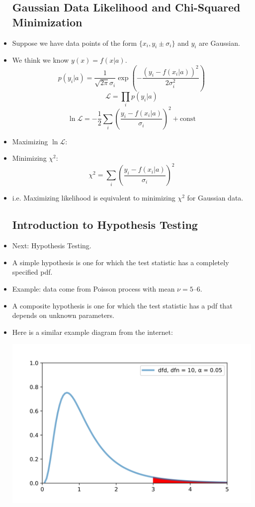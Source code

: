 \begin{itemize}
            \subsection{Gaussian Data Likelihood and Chi-Squared Minimization}
      \item Suppose we have data points of the form $\{ x_i, y_i \pm \sigma_i \}$ and $y_i$ are Gaussian.
      \item We think we know  $y(x) = f(x|a)$.
            \[
                  p(y_i|a) = \frac{1}{\sqrt{2 \pi} \sigma_i} \exp \left( -\frac{(y_i - f(x_i|a))^2}{2 \sigma_i^2} \right)
            \]
            \[
                  \mathcal{L} = \prod_{i} p(y_i|a)
            \]
            \[
                  \ln \mathcal{L} = -\frac{1}{2} \sum_{i} \left( \frac{y_i - f(x_i|a)}{\sigma_i} \right)^2 + \text{const}
            \]
      \item Maximizing $\ln \mathcal{L}$:
      \item Minimizing $\chi^2$:
            \[
                  \chi^2 = \sum_{i} \left( \frac{y_i - f(x_i|a)}{\sigma_i} \right)^2
            \]
      \item i.e. Maximizing likelihood is equivalent to minimizing $\chi^2$ for Gaussian data.

            \subsection{Introduction to Hypothesis Testing}
      \item Next: Hypothesis Testing.
      \item A simple hypothesis is one for which the test statistic has a completely specified pdf.
      \item Example: data come from Poisson process with mean $\nu = 5$–$6$.
      \item A composite hypothesis is one for which the test statistic has a pdf that depends on unknown parameters.

      \item Here is a similar example diagram from the internet:

            \includegraphics[width = 0.5\linewidth]{Images/lec14-ftest.png}


\end{itemize}

